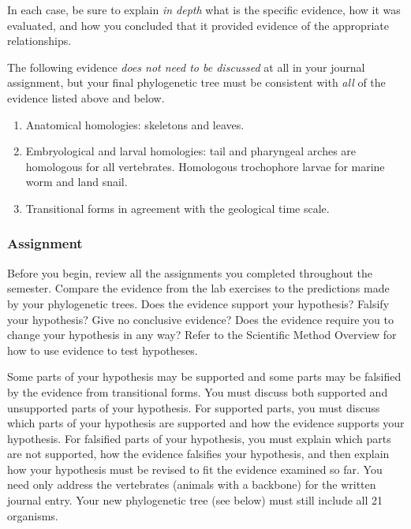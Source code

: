 \documentclass[12pt]{exam}
\begin{document}
In each case, be sure to explain \emph{in depth} what is the specific
evidence, how it was evaluated, and how you concluded that it provided
evidence of the appropriate relationships.

The following evidence \emph{does not need to be discussed} at all in
your journal assignment, but your final phylogenetic tree must be
consistent with \emph{all} of the evidence listed above and below.

\begin{enumerate}[resume]

\item Anatomical homologies: skeletons and leaves.
  
\item Embryological and larval homologies: tail and pharyngeal arches
  are homologous for all vertebrates. Homologous trochophore larvae for
  marine worm and land snail.
  
\item Transitional forms in agreement with the geological time
  scale.
  
\end{enumerate}





\subsubsection*{Assignment}

Before you begin, review all the assignments you completed throughout
the semester.   
Compare the evidence from the lab exercises to the predictions 
made by your phylogenetic trees. Does the evidence support your
hypothesis? Falsify your hypothesis? Give no conclusive evidence? 
Does the evidence require you to change your hypothesis in any way? 
Refer to the Scientific Method Overview for how to use evidence to test 
hypotheses.

Some parts of your hypothesis may be supported and
some parts may be falsified by the evidence from transitional forms.
You must discuss both supported and unsupported parts of your
hypothesis. For supported parts, you must discuss which parts of your
hypothesis are supported and how the evidence supports your hypothesis.
For falsified parts of your hypothesis, you must explain which parts are
not supported, how the evidence falsifies your hypothesis, and then
explain how your hypothesis must be revised to fit the evidence examined
so far. You need only address the vertebrates (animals with a
backbone) for the written journal entry. Your new phylogenetic tree (see
below) must still include all 21 organisms.
\end{document}
